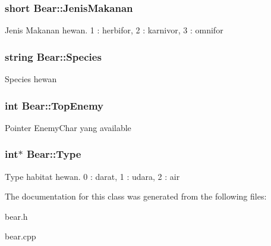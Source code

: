 \subsubsection[{\texorpdfstring{Jenis\+Makanan}{JenisMakanan}}]{\setlength{\rightskip}{0pt plus 5cm}short Bear\+::\+Jenis\+Makanan\hspace{0.3cm}{\ttfamily [protected]}}\hypertarget{class_bear_af7d119e505bc59bdf0dc57798a513411}{}\label{class_bear_af7d119e505bc59bdf0dc57798a513411}
Jenis Makanan hewan. 1 \+: herbifor, 2 \+: karnivor, 3 \+: omnifor 
\subsubsection[{\texorpdfstring{Species}{Species}}]{\setlength{\rightskip}{0pt plus 5cm}string Bear\+::\+Species\hspace{0.3cm}{\ttfamily [protected]}}\hypertarget{class_bear_a2fb3468c903430fc04e61d746fdc0ca4}{}\label{class_bear_a2fb3468c903430fc04e61d746fdc0ca4}
Species hewan 
\subsubsection[{\texorpdfstring{Top\+Enemy}{TopEnemy}}]{\setlength{\rightskip}{0pt plus 5cm}int Bear\+::\+Top\+Enemy\hspace{0.3cm}{\ttfamily [protected]}}\hypertarget{class_bear_a7d03f6795109ce70a28a7941394868a1}{}\label{class_bear_a7d03f6795109ce70a28a7941394868a1}
Pointer Enemy\+Char yang available 
\subsubsection[{\texorpdfstring{Type}{Type}}]{\setlength{\rightskip}{0pt plus 5cm}int$\ast$ Bear\+::\+Type\hspace{0.3cm}{\ttfamily [protected]}}\hypertarget{class_bear_a03e9a8157b73c13012c774d1cc2dc2ce}{}\label{class_bear_a03e9a8157b73c13012c774d1cc2dc2ce}
Type habitat hewan. 0 \+: darat, 1 \+: udara, 2 \+: air 

The documentation for this class was generated from the following files\+:\begin{DoxyCompactItemize}
\item 
bear.\+h\item 
bear.\+cpp\end{DoxyCompactItemize}
